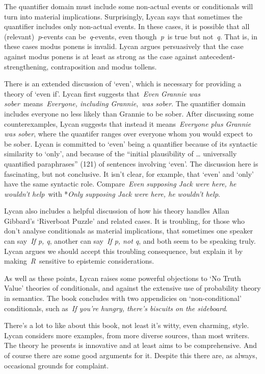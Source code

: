 \documentclass[
  11pt,
  letterpaper,
  DIV=11,
  numbers=noendperiod,
  twoside]{scrartcl}
\begin{document}
The quantifier domain must include some non-actual events or
conditionals will turn into material implications. Surprisingly, Lycan
says that sometimes the quantifier includes only non-actual events. In
these cases, it is possible that all (relevant)~\emph{p}-events can
be~\emph{q}-events, even though~\emph{p}~is true but not~\emph{q}. That
is, in these cases modus ponens is invalid. Lycan argues persuasively
that the case against modus ponens is at least as strong as the case
against antecedent-strengthening, contraposition and modus tollens.

There is an extended discussion of `even', which is necessary for
providing a theory of `even if'. Lycan first suggests that~\emph{Even
Grannie was sober}~means~\emph{Everyone, including Grannie},~\emph{was
sober}. The quantifier domain includes everyone no less likely than
Grannie to be sober. After discussing some counterexamples, Lycan
suggests that instead it means~\emph{Everyone plus Grannie was sober},
where the quantifer ranges over everyone whom you would expect to be
sober. Lycan is committed to `even' being a quantifier because of its
syntactic similarity to `only', and because of the ``initial
plausibility of \ldots{} universally quantified paraphrases'' (121) of
sentences involving `even'. The discussion here is fascinating, but not
conclusive. It isn't clear, for example, that `even' and `only' have the
same syntactic role. Compare~\emph{Even supposing Jack were here, he
wouldn't help}~with *\emph{Only supposing Jack were here, he wouldn't
help}.

Lycan also includes a helpful discussion of how his theory handles Allan
Gibbard's `Riverboat Puzzle' and related cases. It is troubling, for
those who don't analyse conditionals as material implications, that
sometimes one speaker can say~\emph{If p, q}, another can say~\emph{If
p, not q}, and both seem to be speaking truly. Lycan argues we should
accept this troubling consequence, but explain it by
making~\emph{R}~sensitive to epistemic considerations.

As well as these points, Lycan raises some powerful objections to `No
Truth Value' theories of conditionals, and against the extensive use of
probability theory in semantics. The book concludes with two appendicies
on `non-conditional' conditionals, such as~\emph{If you're hungry,
there's biscuits on the sideboard}.

There's a lot to like about this book, not least it's witty, even
charming, style. Lycan considers more examples, from more diverse
sources, than most writers. The theory he presents is innovative and at
least aims to be comprehensive. And of course there are some good
arguments for it. Despite this there are, as always, occasional grounds
for complaint.
\end{document}
